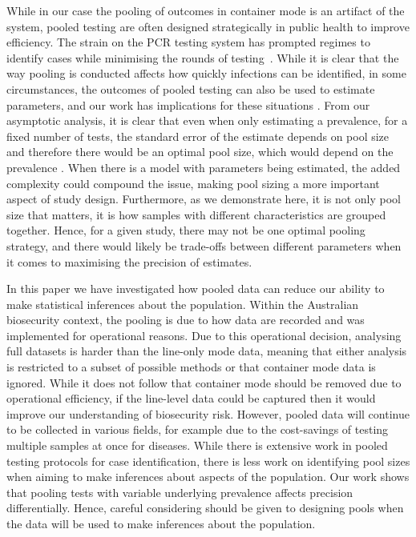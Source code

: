 \documentclass[aoas]{imsart}
\begin{document}
While in our case the pooling of outcomes in container mode is an artifact of the system, pooled testing are often designed strategically in public health to improve efficiency. The strain on the PCR testing system has prompted regimes to identify cases while minimising the rounds of testing~\cite{mutesa_pooled_2021}. While it is clear that the way pooling is conducted affects how quickly infections can be identified,  {in some circumstances, the outcomes of pooled testing can also be used to estimate parameters, and our work has implications for these situations} \cite{delaigle_nonparametric_2015, chatterjee_regression_2020, mcmahan_bayesian_2017, liu_generalized_2020}. From our asymptotic analysis, it is clear that even when only estimating a prevalence, for a fixed number of tests, the standard error of the estimate depends on pool size and therefore there would be an optimal pool size, which would depend on the prevalence  \cite{keeling2022modeling}. When there is a model with parameters being estimated, the added complexity could compound the issue, making pool sizing a more important aspect of study design. Furthermore, as we demonstrate here, it is not only pool size that matters, it is how samples with different characteristics are grouped together. Hence, for a given study, there may not be one optimal pooling strategy, and there would likely be trade-offs between different parameters when it comes to maximising the precision of estimates. 

 {In this paper we have investigated how pooled data can reduce our ability to make statistical inferences about the population. Within the Australian biosecurity context, the pooling is due to how data are recorded and was implemented for operational reasons. Due to this operational decision, analysing full datasets is harder than the line-only mode data, meaning that either analysis is restricted to a subset of possible methods or that container mode data is ignored. While it does not follow that container mode should be removed due to operational efficiency, if the line-level data could be captured then it would improve our understanding of biosecurity risk. 
However, pooled data will continue to be collected in various fields, for example due to the cost-savings of testing multiple samples at once for diseases.
While there is extensive work in pooled testing protocols for case identification, there is less work on identifying pool sizes when aiming to make inferences about aspects of the population.
Our work shows that pooling tests with variable underlying prevalence affects precision differentially. Hence, careful considering should be given to designing pools when the data will be used to make inferences about the population.}
\end{document}
